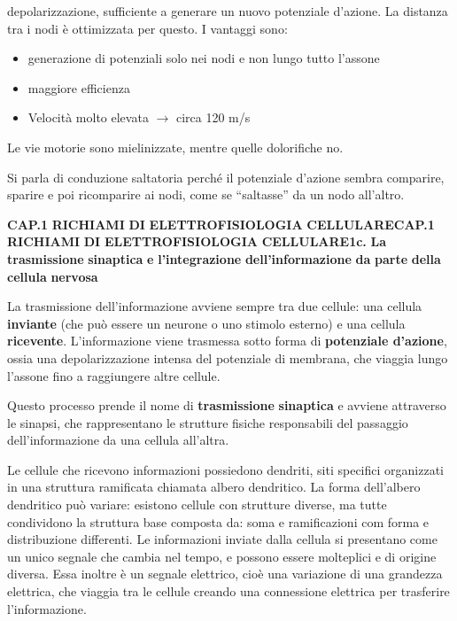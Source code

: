 \documentclass[12pt,a4paper]{book}
\begin{document}
depolarizzazione, sufficiente a generare un nuovo potenziale d'azione. La distanza tra i nodi è ottimizzata per questo. I vantaggi sono:

\begin{itemize}
  \item generazione di potenziali solo nei nodi e non lungo tutto l'assone
  \item maggiore efficienza
  \item Velocità molto elevata $\rightarrow$ circa 120 m/s
\end{itemize}
Le vie motorie sono mielinizzate, mentre quelle dolorifiche no.

Si parla di conduzione saltatoria perché il potenziale d'azione sembra comparire, sparire e poi ricomparire ai nodi, come se ``saltasse'' da un nodo all'altro.

\textbf{CAP.1}\textbf{ }\textbf{RICHIAMI}\textbf{ }\textbf{DI}\textbf{ }\textbf{ELETTROFISIOLOGIA}\textbf{ }\textbf{CELLULARE}\textbf{CAP.1}\textbf{ }\textbf{RICHIAMI}\textbf{ }\textbf{DI}\textbf{ }\textbf{ELETTROFISIOLOGIA}\textbf{ }\textbf{CELLULARE}\textbf{1c.}\textbf{ }\textbf{La}\textbf{ }\textbf{trasmissione}\textbf{ }\textbf{sinaptica}\textbf{ }\textbf{e}\textbf{ }\textbf{l'integrazione}\textbf{ }\textbf{dell'informazione}\textbf{ }\textbf{da}\textbf{ }\textbf{parte}\textbf{ }\textbf{della}\textbf{ }\textbf{cellula}\textbf{ }\textbf{nervosa}

La trasmissione dell'informazione avviene sempre tra due cellule: una cellula \textbf{inviante}\textbf{ }(che può essere un neurone o uno stimolo esterno) e una cellula \textbf{ricevente}. L'informazione viene trasmessa sotto forma di \textbf{potenziale d'azione}, ossia una depolarizzazione intensa del potenziale di membrana, che viaggia lungo l'assone fino a raggiungere altre cellule.

Questo processo prende il nome di \textbf{trasmissione}\textbf{ }\textbf{sinaptica}\textbf{ }e avviene attraverso le sinapsi, che rappresentano le strutture fisiche responsabili del passaggio dell'informazione da una cellula all'altra.

Le cellule che ricevono informazioni possiedono dendriti, siti specifici organizzati in una struttura ramificata chiamata albero dendritico. La forma dell'albero dendritico può variare: esistono cellule con strutture diverse, ma tutte condividono la struttura base composta da: soma e ramificazioni com forma e distribuzione diﬀerenti. Le informazioni inviate dalla cellula si presentano come un unico segnale che cambia nel tempo, e possono essere molteplici e di origine diversa. Essa inoltre è un segnale elettrico, cioè una variazione di una grandezza elettrica, che viaggia tra le cellule creando una connessione elettrica per trasferire l'informazione.
\end{document}
